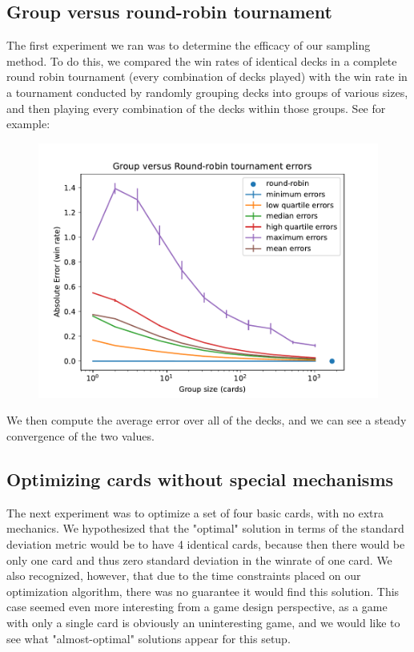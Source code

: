 \subsection{Group versus round-robin tournament}

The first experiment we ran was to determine the efficacy of our sampling method. To do this, we compared the win rates of identical decks in a complete round robin tournament (every combination of decks played) with the win rate in a tournament conducted by randomly grouping decks into groups of various sizes, and then playing every combination of the decks within those groups. See for example:

\begin{figure}[tb]
	\includegraphics[width=0.9\columnwidth]{group_vs_rr_fig}
\end{figure}


We then compute the average error over all of the decks, and we can see a steady convergence of the two values.


 \subsection{Optimizing cards without special mechanisms}

The next experiment was to optimize a set of four basic cards, with no extra mechanics. We hypothesized that the "optimal" solution in terms of the standard deviation metric would be to have 4 identical cards, because then there would be only one card and thus zero standard deviation in the winrate of one card. We also recognized, however, that due to the time constraints placed on our optimization algorithm, there was no guarantee it would find this solution. This case seemed even more interesting from a game design perspective, as a game with only a single card is obviously an uninteresting game, and we would like to see what "almost-optimal" solutions appear for this setup.

